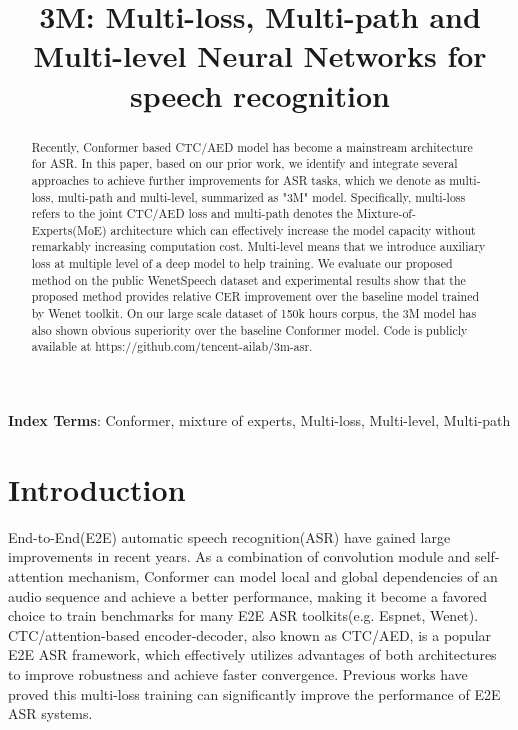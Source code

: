 \documentclass[a4paper]{article}
\title{3M: Multi-loss, Multi-path and Multi-level Neural Networks for speech recognition}
\begin{document}
\maketitle

\begin{abstract}
Recently, Conformer based CTC/AED model has become a mainstream architecture for ASR. In this paper, based on our prior work, we identify and integrate several approaches to achieve further improvements for ASR tasks, which we denote as multi-loss, multi-path and multi-level, summarized as "3M" model. Specifically, multi-loss refers to the joint CTC/AED loss and multi-path denotes the Mixture-of-Experts(MoE) architecture which can effectively increase the model capacity without remarkably increasing computation cost. Multi-level means that we introduce auxiliary loss at multiple level of a deep model to help training.
We evaluate our proposed method on the public WenetSpeech dataset and experimental results show that the proposed method provides  relative CER improvement over the baseline model trained by Wenet toolkit. On our large scale dataset of 150k hours corpus, the 3M model has also shown obvious superiority over the baseline Conformer model. Code is publicly available at https://github.com/tencent-ailab/3m-asr.



\end{abstract}
\noindent\textbf{Index Terms}: Conformer, mixture of experts, Multi-loss, Multi-level, Multi-path

\renewcommand{\thefootnote}{\fnsymbol{footnote}}



\section{Introduction}
End-to-End(E2E) automatic speech recognition(ASR) have gained large improvements in recent years. As a combination of convolution module and self-attention mechanism, Conformer\cite{conformer} can model local and global dependencies of an audio sequence and achieve a better performance, making it become a favored choice to train benchmarks for many E2E ASR toolkits(e.g. Espnet\cite{watanabe2018espnet}, Wenet\cite{zhang2021wenet}). CTC/attention-based encoder-decoder, also known as CTC/AED, is a popular E2E ASR framework, which effectively utilizes advantages of both architectures to improve robustness and achieve faster convergence. Previous works\cite{DBLP:journals/corr/HoriWZC17,wu2019improving,watanabe2017hybrid,hori2017joint} have proved this multi-loss training can significantly improve the performance of E2E ASR systems.
\end{document}
